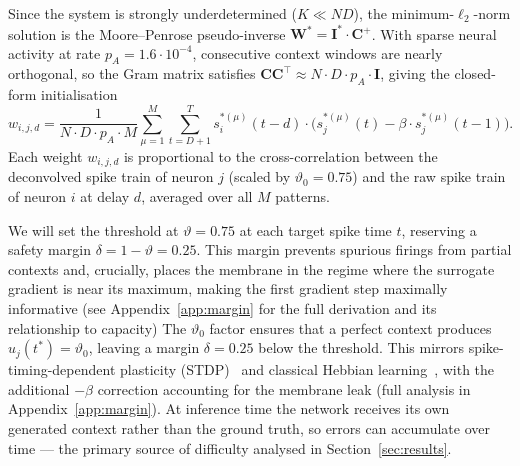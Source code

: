 \documentclass{scrartcl}
\newcommand{\citep}[1]{\parencite{#1}}
\begin{document}
Since the system is strongly underdetermined ($K \ll ND$), the minimum-$\ell_2$-norm solution is the Moore--Penrose pseudo-inverse $\mathbf{W}^* = \mathbf{I}^* \cdot \mathbf{C}^+$. With sparse neural activity at rate $p_A = 1.6\cdot 10^{-4}$, consecutive context windows are nearly orthogonal, so the Gram matrix satisfies $\mathbf{C}\mathbf{C}^\top \approx N \cdot D \cdot p_A \cdot \mathbf{I}$, giving the closed-form initialisation
\begin{equation}
  w_{i, j, d}
  = \frac{1}{N \cdot D \cdot p_A \cdot M}
    \sum_{\mu=1}^{M}\sum_{t=D+1}^{T}
    s_i^{*(\mu)}(t-d)
    \cdot
    \bigl(s_j^{*(\mu)}(t) - \beta \cdot s_j^{*(\mu)}(t-1)\bigr).
  \label{eq:init}
\end{equation}
Each weight $w_{i, j, d}$ is proportional to the cross-correlation between the deconvolved spike train of neuron $j$ (scaled by $\vartheta_0 = 0.75$) and the raw spike train of neuron $i$ at delay $d$, averaged over all $M$ patterns. 


 We will set the threshold at $\vartheta = 0.75$ at each target spike time $t$, reserving a safety margin $\delta = 1 - \vartheta = 0.25$. This margin prevents spurious firings from partial contexts and, crucially, places the membrane in the regime where the surrogate gradient is near its maximum, making the first gradient step maximally informative (see Appendix~\ref{app:margin} for the full derivation and its relationship to capacity)
  The $\vartheta_0$ factor ensures that a perfect context produces $u_j(t^*) = \vartheta_0$, leaving a margin $\delta = 0.25$ below the threshold. This mirrors spike-timing-dependent plasticity (STDP)~\citep{Izhikevich2006} and classical Hebbian learning~\citep{Perrinet2002}, with the additional $-\beta$ correction accounting for the membrane leak (full analysis in Appendix~\ref{app:margin}). At inference time the network receives its own generated context rather than the ground truth, so errors can accumulate over time --- the primary source of difficulty analysed in Section~\ref{sec:results}.
\end{document}

